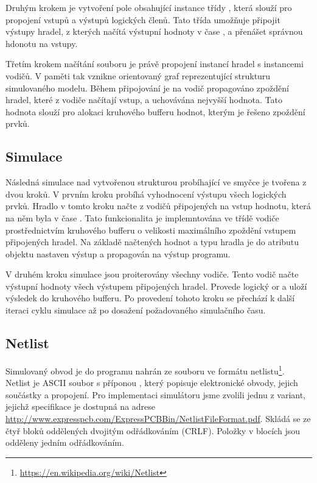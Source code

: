 \documentclass[11pt,a4paper]{article}
\begin{document}
			Druhým krokem je vytvoření pole obsahující instance třídy , která slouží pro propojení vstupů a výstupů logických členů. Tato třída umožňuje připojit výstupy hradel, z kterých načítá výstupní hodnoty v čase , a přenášet správnou hdonotu na vstupy.

			Třetím krokem načítání souboru je právě propojení instancí hradel s instancemi vodičů. V paměti tak vznikne orientovaný graf reprezentující strukturu simulovaného modelu. Během připojování je na vodič propagováno zpoždění hradel, které z vodiče načítají vstup, a uchovávána nejvyšší hodnota. Tato hodnota slouží pro alokaci kruhového bufferu hodnot, kterým je řešeno zpoždění prvků.

		\subsection{Simulace}
			Následná simulace nad vytvořenou strukturou probíhající ve smyčce je tvořena z dvou kroků. V prvním kroku probíhá vyhodnocení výstupu všech logických prvků. Hradlo v tomto kroku načte z vodičů připojených na vstup hodnotu, která na něm byla v čase . Tato funkcionalita je implemntována ve třídě vodiče prostřednictvím kruhového bufferu o velikosti maximálního zpoždění vstupem připojených hradel. Na základě načtených hodnot a typu hradla je do atributu objektu nastaven výstup a propagován na výstup programu.

			V druhém kroku simulace jsou proiterovány všechny vodiče. Tento vodič načte výstupní hodnoty všech výstupem připojených hradel. Provede logický or a uloží výsledek do kruhového bufferu. Po provedení tohoto kroku se přechází k další iteraci cyklu simulace až po dosažení požadovaného simulačního času.

		\subsection{Netlist}
			\label{netlist}

			Simulovaný obvod je do programu nahrán ze souboru ve formátu netlistu\footnote{\url{https://en.wikipedia.org/wiki/Netlist}}. Netlist je ASCII soubor s příponou , který popisuje elektronické obvody, jejich součástky a propojení. Pro implementaci simulátoru jsme zvolili jednu z variant, jejichž specifikace je dostupná na adrese \url{http://www.expresspcb.com/ExpressPCBBin/NetlistFileFormat.pdf}.
			Skládá se ze čtyř bloků oddělených dvojitým odřádkováním (CRLF). Položky v blocích jsou odděleny jedním odřádkováním.
\end{document}
